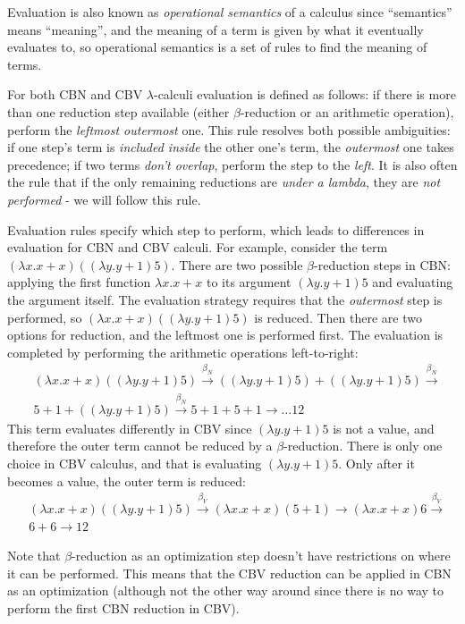 \documentclass{article}
\newcommand{\lam}{\lambda}
\newcommand{\cbnb}{\overset{\beta_{N}}{\rightarrow}}
\newcommand{\cbvb}{\overset{\beta_{V}}{\rightarrow}}
\begin{document}
Evaluation is also known as \textit{operational semantics} of a calculus since ``semantics'' means ``meaning'', and the meaning of a term is given by what it eventually evaluates to, so operational semantics is a set of rules to find the meaning of terms. 

For both CBN and CBV $\lam$-calculi evaluation is defined as follows: if there is more than one reduction step available (either $\beta$-reduction or an arithmetic operation), perform the \textit{leftmost outermost} one. This rule resolves both possible ambiguities: if one step's term is \textit{included inside} the other one's term, the \textit{outermost} one takes precedence; if two terms \textit{don't overlap}, perform the step to the \textit{left}. It is also often the rule that if the only remaining reductions are \textit{under a lambda}, they are \textit{not performed} - we will follow this rule. 

Evaluation rules specify which step to perform, which leads to differences in evaluation for CBN and CBV calculi. For example, 
consider the term $(\lam x. x + x)((\lam y. y + 1) 5)$. There are two possible $\beta$-reduction steps in CBN: applying the first function $\lam x. x + x$ to its argument $(\lam y. y + 1) 5$ and evaluating the argument itself. The evaluation strategy requires that the \textit{outermost} step is performed, so $(\lam x. x + x)((\lam y. y + 1) 5)$ is reduced. Then there are two options for reduction, and the leftmost one is performed first. The evaluation is completed by performing the arithmetic operations left-to-right:
\begin{align*}
& (\lam x. x + x)((\lam y. y + 1) 5) \cbnb ((\lam y. y + 1) 5) + ((\lam y. y + 1) 5) \cbnb \\
& 5 + 1 + ((\lam y. y + 1) 5) \cbnb 5 + 1 + 5 + 1 \rightarrow \dots  12
\end{align*}
This term evaluates differently in CBV since $(\lam y. y + 1) 5$ is not a value, and therefore the outer term cannot be reduced by a $\beta$-reduction. There is only one choice in CBV calculus, and that is evaluating $(\lam y. y + 1) 5$. Only after it becomes a value, the outer term is reduced:
\begin{align*}
& (\lam x. x + x)((\lam y. y + 1) 5) \cbvb (\lam x. x + x)(5 + 1) \rightarrow  (\lam x. x + x)6 \cbvb \\
& 6 + 6 \rightarrow 12
\end{align*}

Note that $\beta$-reduction as an optimization step doesn't have restrictions on where it can be performed. This means that the CBV reduction can be applied in CBN as an optimization (although not the other way around since there is no way to perform the first CBN reduction in CBV). 
\end{document}
